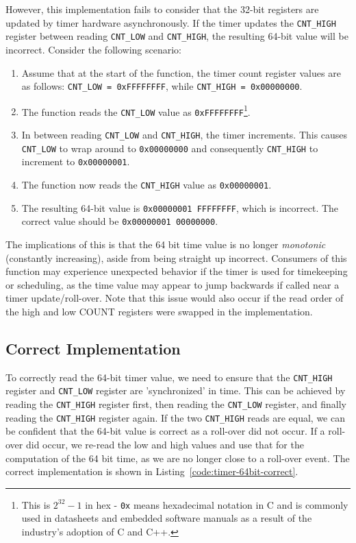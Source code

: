 \documentclass[main.tex]{subfiles}
\begin{document}
\noindent However, this implementation fails to consider that the 32-bit registers are updated by timer hardware asynchronously. If the timer updates the \texttt{CNT\_HIGH} register between reading \texttt{CNT\_LOW} and \texttt{CNT\_HIGH}, the resulting 64-bit value will be incorrect. Consider the following scenario:
\begin{enumerate}
    \item Assume that at the start of the function, the timer count register values are as follows: \texttt{CNT\_LOW = 0xFFFFFFFF}, while \texttt{CNT\_HIGH = 0x00000000}.
    \item The function reads the \texttt{CNT\_LOW} value as \texttt{0xFFFFFFFF}\footnote{This is $2^{32}-1$ in hex - \texttt{0x} means hexadecimal notation in C and is commonly used in datasheets and embedded software manuals as a result of the industry's adoption of C and C++.}.
    \item In between reading \texttt{CNT\_LOW} and \texttt{CNT\_HIGH}, the timer increments. This causes \texttt{CNT\_LOW} to wrap around to \texttt{0x00000000} and consequently \texttt{CNT\_HIGH} to increment to \texttt{0x00000001}.
    \item The function now reads the \texttt{CNT\_HIGH} value as \texttt{0x00000001}.
    \item The resulting 64-bit value is \texttt{0x00000001 FFFFFFFF}, which is incorrect. The correct value should be \texttt{0x00000001 00000000}.
\end{enumerate}

\noindent The implications of this is that the 64 bit time value is no longer \textit{monotonic} (constantly increasing), aside from being straight up incorrect. Consumers of this function may experience unexpected behavior if the timer is used for timekeeping or scheduling, as the time value may appear to jump backwards if called near a timer update/roll-over. Note that this issue would also occur if the read order of the high and low COUNT registers were swapped in the implementation.

\subsection{Correct Implementation}
To correctly read the 64-bit timer value, we need to ensure that the \texttt{CNT\_HIGH} register and \texttt{CNT\_LOW} register are 'synchronized' in time. This can be achieved by reading the \texttt{CNT\_HIGH} register first, then reading the \texttt{CNT\_LOW} register, and finally reading the \texttt{CNT\_HIGH} register again. If the two \texttt{CNT\_HIGH} reads are equal, we can be confident that the 64-bit value is correct as a roll-over did not occur. If a roll-over did occur, we re-read the low and high values and use that for the computation of the 64 bit time, as we are no longer close to a roll-over event. The correct implementation is shown in Listing~\ref{code:timer-64bit-correct}.


\end{document}
